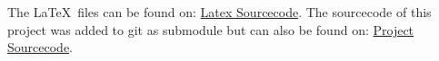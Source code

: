 \documentclass[../ImageClassifier.tex]{subfiles}
\begin{document}
    The \LaTeX\ files can be found on: \href{https://gitlab.fa-wi.de/punicawaikiki/image-classifier-report}{Latex Sourcecode}.
    \newline
    The sourcecode of this project was added to git as submodule but can also be found on: \href{https://gitlab.fa-wi.de/punicawaikiki/image-classifier}{Project Sourcecode}.
\end{document}
